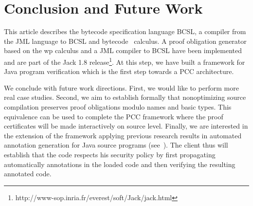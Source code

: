 \section{Conclusion and Future Work}\label{conclusion}
This article describes the bytecode specification language BCSL, a compiler from the JML language to BCSL and bytecode \wpi \ calculus.
A proof obligation generator based on the wp calculus and a JML compiler to BCSL have been implemented and are part of the Jack 1.8 release\footnote{http://www-sop.inria.fr/everest/soft/Jack/jack.html}.
At this step, we have built a framework for Java program verification which is the first step towards a PCC architecture.

 We conclude with future work directions. 
First, we would like to perform more real case studies. Second, we aim to establish formally that nonoptimizing source compilation
preserves proof obligations modulo names and basic types. This equivalence can
 be used to complete the PCC framework where the proof certificates will be made interactively on source level. Finally, we are interested in 
the extension of the framework applying previous research results in automated annotation generation for Java source programs
 (see~\cite{PBBHL}). The client thus will establish that the code respects his security policy %
by first propagating automatically annotations in the loaded code and then verifying the resulting annotated code.





